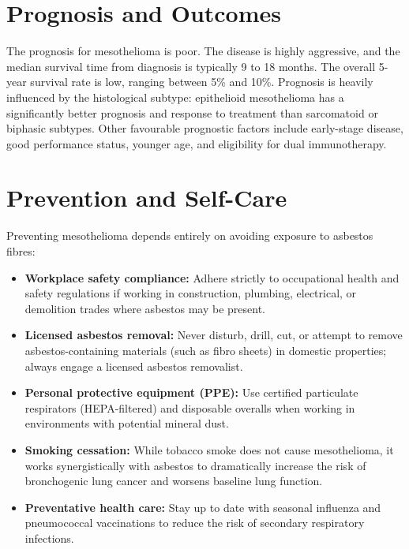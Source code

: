 \section*{Prognosis and Outcomes}
The prognosis for mesothelioma is poor. The disease is highly aggressive, and the median survival time from diagnosis is typically 9 to 18 months. The overall 5-year survival rate is low, ranging between 5\% and 10\%. Prognosis is heavily influenced by the histological subtype: epithelioid mesothelioma has a significantly better prognosis and response to treatment than sarcomatoid or biphasic subtypes. Other favourable prognostic factors include early-stage disease, good performance status, younger age, and eligibility for dual immunotherapy.

\section*{Prevention and Self-Care}
Preventing mesothelioma depends entirely on avoiding exposure to asbestos fibres:
\begin{itemize}
    \item \textbf{Workplace safety compliance:} Adhere strictly to occupational health and safety regulations if working in construction, plumbing, electrical, or demolition trades where asbestos may be present.
    \item \textbf{Licensed asbestos removal:} Never disturb, drill, cut, or attempt to remove asbestos-containing materials (such as fibro sheets) in domestic properties; always engage a licensed asbestos removalist.
    \item \textbf{Personal protective equipment (PPE):} Use certified particulate respirators (HEPA-filtered) and disposable overalls when working in environments with potential mineral dust.
    \item \textbf{Smoking cessation:} While tobacco smoke does not cause mesothelioma, it works synergistically with asbestos to dramatically increase the risk of bronchogenic lung cancer and worsens baseline lung function.
    \item \textbf{Preventative health care:} Stay up to date with seasonal influenza and pneumococcal vaccinations to reduce the risk of secondary respiratory infections.
\end{itemize}

